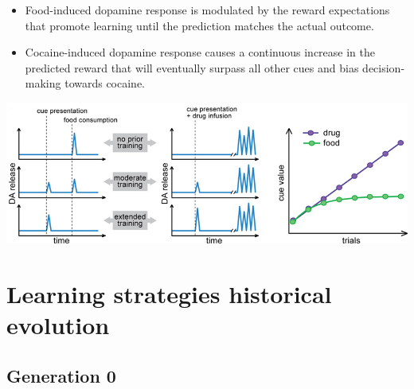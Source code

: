 \begin{@empty}
    \small
    \begin{example}
        \phantom{}
        \begin{itemize}
            \item Food-induced dopamine response is modulated by the reward expectations that promote learning until the prediction matches the actual outcome.
            \item Cocaine-induced dopamine response causes a continuous increase in the predicted reward that
                will eventually surpass all other cues and bias decision-making towards cocaine.
        \end{itemize}
        \begin{center}
            \includegraphics[width=0.8\linewidth]{./img/dopamine_food_cocaine.png}
        \end{center}
    \end{example}
\end{@empty}



\section{Learning strategies historical evolution}


    


\subsection{Generation 0}

